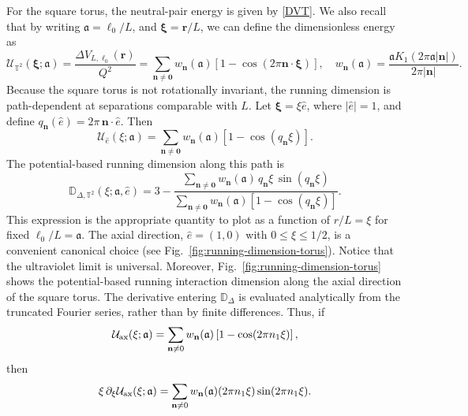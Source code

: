 \documentclass[openacc]{rsproca_new}%
\begin{document}
For the square torus, the neutral-pair energy is given by \eqref{DVT}. We also recall that by writing $\mathfrak{a}=\ell_0/L$, and $\boldsymbol{\xi}=\mathbf r/L$, we can define the dimensionless energy as
\begin{equation}
  \mathcal U_{\mathbb T^2}(\boldsymbol{\xi};\mathfrak{a})=\frac{\Delta V_{L,\ell_0}(\mathbf r)}{Q^2}=\sum_{\mathbf n\neq\mathbf 0}w_{\mathbf n}(\mathfrak{a})\left[1-\cos(2\pi\mathbf n\cdot\boldsymbol{\xi})\right],\quad w_{\mathbf n}(\mathfrak{a})=\frac{\mathfrak{a}K_1(2\pi \mathfrak{a}|\mathbf n|)}{2\pi|\mathbf n|}.
\end{equation}
Because the square torus is not rotationally invariant, the running dimension is path-dependent at separations comparable with $L$. Let $\boldsymbol{\xi}=\xi\hat e$, where $|\hat e|=1$, and define $q_{\mathbf n}(\hat e)=2\pi\,\mathbf n\cdot\hat e$. Then
\begin{equation}
  \mathcal U_{\hat e}(\xi;\mathfrak{a})=\sum_{\mathbf n\neq\mathbf 0}w_{\mathbf n}(\mathfrak{a})\left[1-\cos(q_{\mathbf n}\xi)\right].
\end{equation}
The potential-based running dimension along this path is
\begin{equation}\label{DDelta}
  \mathbb D_{\Delta,\mathbb T^2}(\xi;\mathfrak{a},\hat e)=3-\frac{\displaystyle\sum_{\mathbf n\neq\mathbf 0} w_{\mathbf n}(\mathfrak{a})\,q_{\mathbf n}\xi\,\sin(q_{\mathbf n}\xi)}{\displaystyle\sum_{\mathbf n\neq\mathbf 0}w_{\mathbf n}(\mathfrak{a})\left[1-\cos(q_{\mathbf n}\xi)\right]}.
\end{equation}
This expression is the appropriate quantity to plot as a function of $r/L=\xi$ for fixed $\ell_0/L=\mathfrak{a}$. The axial direction, $\hat e=(1,0)$ with $0\leq \xi\leq 1/2$, is a convenient canonical choice (see Fig.~\ref{fig:running-dimension-torus}). Notice that the ultraviolet limit is universal. Moreover, Fig.~\ref{fig:running-dimension-torus} shows the potential-based running interaction dimension along the axial direction of the square torus. The derivative entering $\mathbb D_\Delta$ is evaluated analytically from the truncated Fourier series, rather than by finite differences. Thus, if
\begin{equation}
  \mathcal U_{\rm ax}(\xi;\mathfrak a)=\sum_{\mathbf n\neq0} w_{\mathbf n}(\mathfrak a)\left[1-\cos(2\pi n_1\xi)\right],
\end{equation}
then
\begin{equation}
  \xi\,\partial_\xi\mathcal U_{\rm ax}(\xi;\mathfrak a) = \sum_{\mathbf n\neq0}w_{\mathbf n}(\mathfrak a)(2\pi n_1\xi)\sin(2\pi n_1\xi).
\end{equation}
\end{document}
